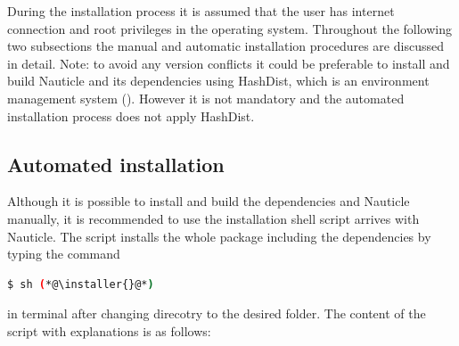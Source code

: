 \documentclass[a4paper,12pt,openany]{book}
\newcommand{\myhref}[3][nauticlegreen_dark]{\href{#2}{\color{#1}{#3}}}%
\theoremstyle{break}
\begin{document}
During the installation process it is assumed that the user has internet connection and root privileges in the operating system. Throughout the following two subsections the manual and automatic installation procedures are discussed in detail.
Note: to avoid any version conflicts it could be preferable to install and build Nauticle and its dependencies using HashDist, which is an environment management system (\myhref{https://github.com/hashdist/hashdist}{https://github.com/hashdist/ hashdist}). However it is not mandatory and the automated installation process does not apply HashDist.
\subsection{Automated installation}
Although it is possible to install and build the dependencies and Nauticle manually, it is recommended to use the installation shell script arrives with Nauticle. The script installs the whole package including the dependencies by typing the command
\begin{lstlisting}[language=bash]
  $ sh (*@\installer{}@*)
\end{lstlisting}
in terminal after changing direcotry to the desired folder. The content of the script with explanations is as follows:
\end{document}
